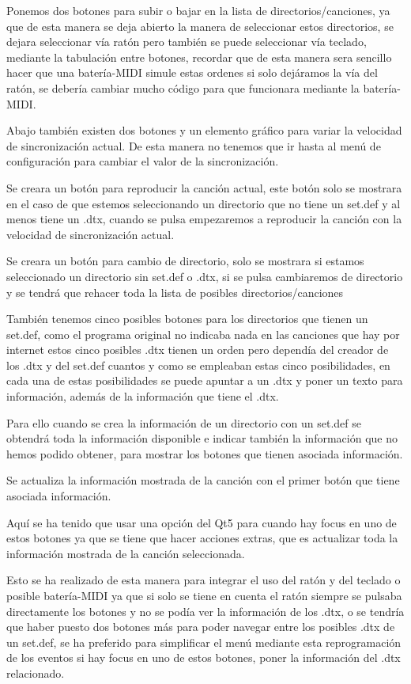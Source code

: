 \documentclass[a4paper,11pt,oneside]{book}
\begin{document}
Ponemos dos botones para subir o bajar en la lista de directorios/canciones, ya que de esta manera se deja abierto la manera de seleccionar estos directorios, se dejara seleccionar vía ratón pero también se puede seleccionar vía teclado, mediante la tabulación entre botones, recordar que de esta manera sera sencillo hacer que una batería-MIDI simule estas ordenes si solo dejáramos la vía del ratón, se debería cambiar mucho código para que funcionara mediante la batería-MIDI.

Abajo también existen dos botones y un elemento gráfico para variar la velocidad de sincronización actual. De esta manera no tenemos que ir hasta al menú de configuración para cambiar el valor de la sincronización.

Se creara un botón para reproducir la canción actual, este botón solo se mostrara en el caso de que estemos seleccionando un directorio que no tiene un set.def y al menos tiene un .dtx, cuando se pulsa empezaremos a reproducir la canción con la velocidad de sincronización actual.

Se creara un botón para cambio de directorio, solo se mostrara si estamos seleccionado un directorio sin set.def o .dtx, si se pulsa cambiaremos de directorio y se tendrá que rehacer toda la lista de posibles directorios/canciones

También tenemos cinco posibles botones para los directorios que tienen un set.def, como el programa original no indicaba nada en las canciones que hay por internet estos cinco posibles .dtx tienen un orden pero dependía del creador de los .dtx y del set.def cuantos y como se empleaban estas cinco posibilidades, en cada una de estas posibilidades se puede apuntar a un .dtx y poner un texto para información, además de la información que tiene el .dtx.

Para ello cuando se crea la información de un directorio con un set.def se obtendrá toda la información disponible e indicar también la información que no hemos podido obtener, para mostrar los botones que tienen asociada información.

Se actualiza la información mostrada de la canción con el primer botón que tiene asociada información.
 
Aquí se ha tenido que usar una opción del Qt5 para cuando hay focus en uno de estos botones ya que se tiene que hacer acciones extras, que es actualizar toda la información mostrada de la canción seleccionada.

Esto se ha realizado de esta manera para integrar el uso del ratón y del teclado o posible batería-MIDI ya que si solo se tiene en cuenta el ratón siempre se pulsaba directamente los botones y no se podía ver la información de los .dtx, o se tendría que haber puesto dos botones más para poder navegar entre los posibles .dtx de un set.def, se ha preferido para simplificar el menú mediante esta reprogramación de los eventos si hay focus en uno de estos botones, poner la información del .dtx relacionado.
\end{document}
